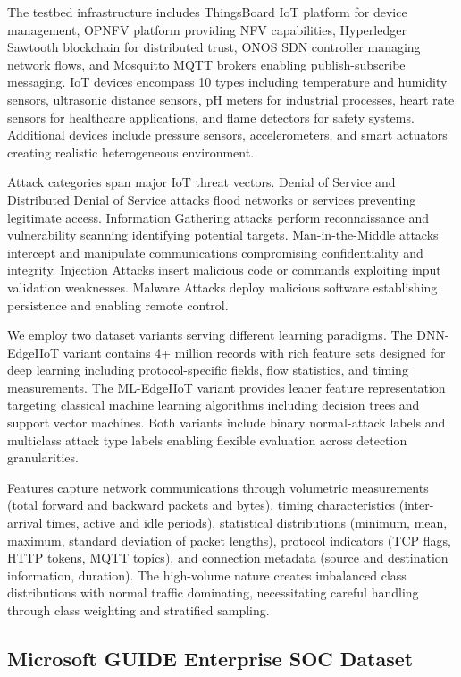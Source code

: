 \documentclass[10pt,journal,compsoc]{IEEEtran}
\begin{document}
The testbed infrastructure includes ThingsBoard IoT platform for device management, OPNFV platform providing NFV capabilities, Hyperledger Sawtooth blockchain for distributed trust, ONOS SDN controller managing network flows, and Mosquitto MQTT brokers enabling publish-subscribe messaging. IoT devices encompass 10 types including temperature and humidity sensors, ultrasonic distance sensors, pH meters for industrial processes, heart rate sensors for healthcare applications, and flame detectors for safety systems. Additional devices include pressure sensors, accelerometers, and smart actuators creating realistic heterogeneous environment.

Attack categories span major IoT threat vectors. Denial of Service and Distributed Denial of Service attacks flood networks or services preventing legitimate access. Information Gathering attacks perform reconnaissance and vulnerability scanning identifying potential targets. Man-in-the-Middle attacks intercept and manipulate communications compromising confidentiality and integrity. Injection Attacks insert malicious code or commands exploiting input validation weaknesses. Malware Attacks deploy malicious software establishing persistence and enabling remote control.

We employ two dataset variants serving different learning paradigms. The DNN-EdgeIIoT variant contains 4+ million records with rich feature sets designed for deep learning including protocol-specific fields, flow statistics, and timing measurements. The ML-EdgeIIoT variant provides leaner feature representation targeting classical machine learning algorithms including decision trees and support vector machines. Both variants include binary normal-attack labels and multiclass attack type labels enabling flexible evaluation across detection granularities.

Features capture network communications through volumetric measurements (total forward and backward packets and bytes), timing characteristics (inter-arrival times, active and idle periods), statistical distributions (minimum, mean, maximum, standard deviation of packet lengths), protocol indicators (TCP flags, HTTP tokens, MQTT topics), and connection metadata (source and destination information, duration). The high-volume nature creates imbalanced class distributions with normal traffic dominating, necessitating careful handling through class weighting and stratified sampling.

\subsection{Microsoft GUIDE Enterprise SOC Dataset}
\end{document}
